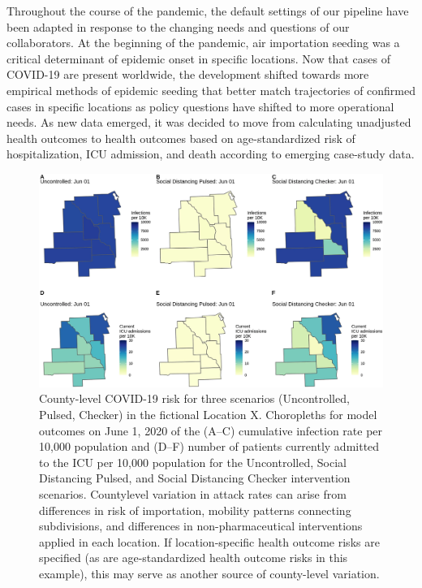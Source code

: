 {Throughout the course of the pandemic, the default settings of our pipeline have been adapted in response to the changing needs and questions of our collaborators. At the beginning of the pandemic, air importation seeding was a critical determinant of epidemic onset in specific locations. Now that cases of COVID-19 are present worldwide, the development shifted towards more empirical methods of epidemic seeding that better match trajectories of confirmed cases in specific locations as policy questions have shifted to more operational needs. As new data emerged, it was decided to move from calculating unadjusted health outcomes to health outcomes based on age-standardized risk of hospitalization, ICU admission, and death according to emerging case-study data.
\begin{figure}[!htb]%
    \centering
    \includegraphics{fig_pipeline/fig4a}
    \caption[County-level COVID-19 risk for three scenarios.]{County-level COVID-19 risk for three scenarios (Uncontrolled, Pulsed, Checker) in the fictional Location X. Choropleths for model outcomes on June 1, 2020 of the (A–C) cumulative infection rate per 10,000 population and (D–F) number of patients currently admitted to the ICU per 10,000 population for the Uncontrolled, Social Distancing Pulsed, and Social Distancing Checker intervention scenarios. Countylevel variation in attack rates can arise from differences in risk of importation, mobility patterns connecting subdivisions, and differences in non-pharmaceutical interventions applied in each location. If location-specific health outcome risks are specified (as are age-standardized health outcome risks in this example), this may serve as another source of county-level variation.}
    \label{fig:pipeline-map}
\end{figure}

}
